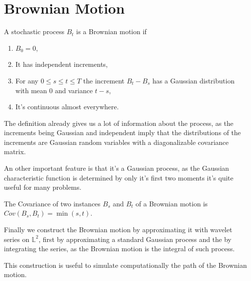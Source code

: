 \section{Brownian Motion}

A stochastic process ${B_t}$ is a Brownian motion if

\begin{enumerate}
    \item $B_0 = 0$,
    \item It has independent increments,
    \item For any $0 \leq s \leq t \leq T$ the increment $B_t - B_s$ has a Gaussian distribution with mean 0 and variance $t - s$,
    \item It's continuous almost everywhere.
\end{enumerate}

The definition already gives us a lot of information about the process,
as the increments being Gaussian and independent imply that the distributions of the increments are Gaussian random variables with a diagonalizable covariance matrix.

An other important feature is that it's a Gaussian process,
as the Gaussian characteristic function is determined by only it's first two moments it's quite useful for many problems.

The Covariance of two instances $B_s$ and $B_t$ of a Brownian motion is $Cov(B_s, B_t) = \min(s, t)$.

Finally we construct the Brownian motion by approximating it with wavelet series on $\mathbb{L}^2$,
first by approximating a standard Gaussian process and the by integrating the series, as the Brownian motion is the integral of such process.

This construction is useful to simulate computationally the path of the Brownian motion.